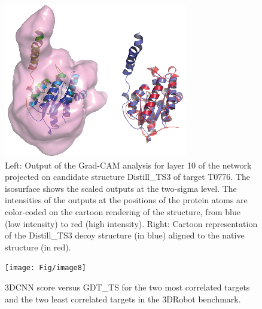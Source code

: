 \documentclass[letter,10pt]{article}
\begin{document}
\begin{figure}[H]
    \centerline{\includegraphics[width=0.8\linewidth]{Fig/FigT0776.eps}}
    \caption{Left: Output of the Grad-CAM analysis for layer 10 of
      the network projected on candidate structure Distill\_TS3 of
      target T0776. The isosurface shows the scaled outputs at the
      two-sigma level. The intensities of the outputs at the positions
      of the protein atoms are color-coded on the cartoon rendering of
      the structure, from blue (low intensity) to red (high
      intensity). Right: Cartoon representation of the Distill\_TS3
      decoy structure (in blue) aligned to the native structure (in
      red).}
    \label{Fig:GradCAMT0776}
\end{figure}


\newpage
{}




\begin{figure}[h]
    \centerline{\texttt{[image: Fig/image8]}}
    \caption{3DCNN score versus GDT\_TS for the two most correlated
      targets and the two least correlated targets in the 3DRobot
      benchmark.}
    \label{Fig:3DRobotBenchmark}
\end{figure}


{}

\end{document}
